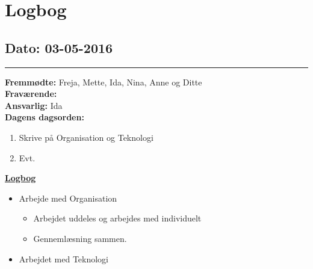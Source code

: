 \chapter{Logbog}
\section{Dato: 03-05-2016}
\hrule
\textbf{Fremmødte: }Freja, Mette, Ida, Nina, Anne og Ditte \\
\textbf{Fraværende: } \\
\textbf{Ansvarlig: } Ida \\
\textbf{Dagens dagsorden: }
\begin{enumerate}
	\item Skrive på Organisation og Teknologi
	\item Evt. 
\end{enumerate}

\underline{\textbf{Logbog}}
\begin{itemize}
\item Arbejde med Organisation
\begin{itemize}
\item Arbejdet uddeles og arbejdes med individuelt
\item Gennemlæsning sammen.
\end{itemize}
\item Arbejdet med Teknologi
\end{itemize}
